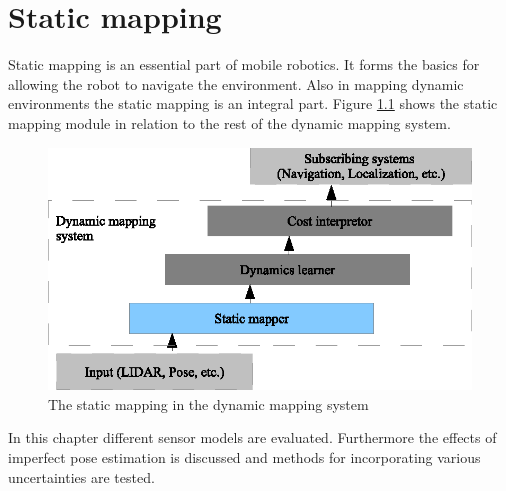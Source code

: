 \chapter{Static mapping}
Static mapping is an essential part of mobile robotics. It forms the basics for allowing the robot to navigate the environment. 
Also in mapping dynamic environments the static mapping is an integral part. Figure \ref{fig:static_map_overview} shows the static mapping module in relation to the rest of the dynamic mapping system.  

\begin{figure}[htbp]
		\centering
		\includegraphics[scale=1]{chapters/static_mapping/figures/static_map_overview.eps}
		\caption{The static mapping in the dynamic mapping system}
		\label{fig:static_map_overview}
\end{figure}

In this chapter different sensor models are evaluated. Furthermore the effects of imperfect pose estimation is discussed and methods for incorporating various uncertainties are tested. 





